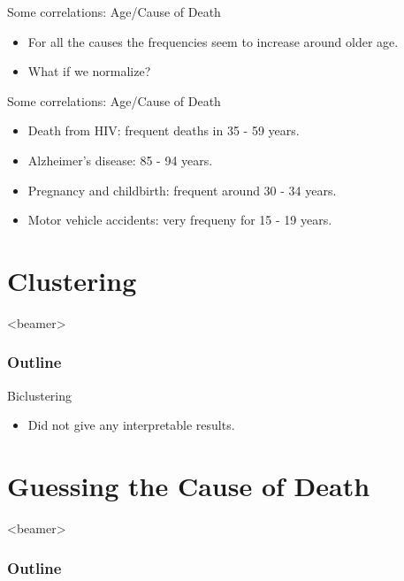 \documentclass[xcolor=table]{beamer}
\begin{document}
  	 \begin{frame}{Some correlations: Age/Cause of Death}
     \begin{itemize}
			\item For all the causes the frequencies seem to increase around older age. 
			\item What if we normalize?
		\end{itemize}
     	\begin{center}
		 \end{center}
     \end{frame}
  	
  	\begin{frame}{Some correlations: Age/Cause of Death}
     \begin{itemize}
			\item Death from HIV:  frequent deaths in 35 - 59 years.
			\item Alzheimer's disease: 85 - 94 years.
			\item Pregnancy and childbirth: frequent around 30 - 34 years.
			\item Motor vehicle accidents: very frequeny for 15 - 19 years.

		\end{itemize}
     	\begin{center}
		 \end{center}
     \end{frame}
  	
\section{Clustering}

	\begin{frame}<beamer>
     \frametitle{Outline}
     \tableofcontents[currentsection]
    \end{frame}
         
  	\begin{frame}{Biclustering}
     \begin{itemize}
		\item Did not give any interpretable results.
	 \end{itemize}
    \end{frame}

\section{Guessing the Cause of Death}
     \begin{frame}<beamer>
     \frametitle{Outline}
     \tableofcontents[currentsection]
     \end{frame}
     
\end{document}
